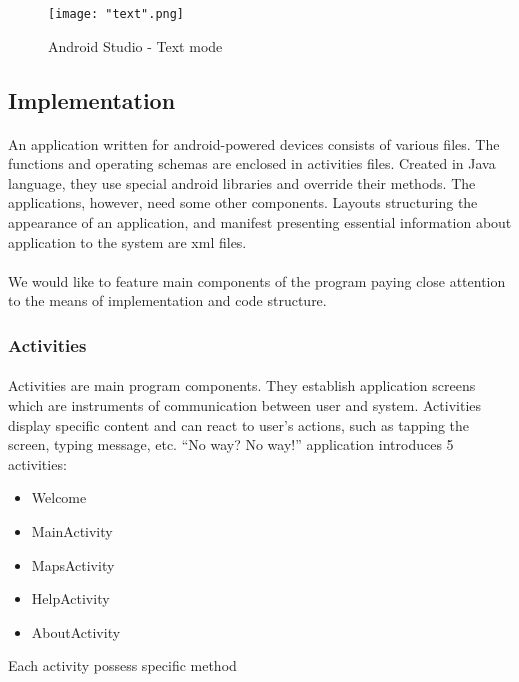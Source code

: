 \documentclass[12pt]{article}
\begin{document}
\begin{figure}[H]
\centerline{\texttt{[image: "text".png]}}
\caption{Android Studio - Text mode}
\label{fig:textMode}
\end{figure}

\subsection{Implementation}
\paragraph{}
An application written for android-powered devices consists of various files. The functions and operating schemas are enclosed in activities files. Created in Java language, they use special android libraries and override their methods. The applications, however, need some other components. Layouts structuring the appearance of an application, and manifest presenting essential information about application to the system are xml files.
\paragraph{}
We would like to feature main components of the program paying close attention to the means of implementation and code structure.

\subsubsection{Activities}
\paragraph{}
Activities are main program components. They establish application screens which are instruments of communication between user and system. Activities display specific content and can react to user's actions, such as tapping the screen, typing message, etc.
``No way? No way!'' application introduces 5 activities:

\begin{itemize}
	\item Welcome
	\item MainActivity
	\item MapsActivity
	\item HelpActivity
	\item AboutActivity
\end{itemize}

Each activity possess specific method \\
\end{document}
